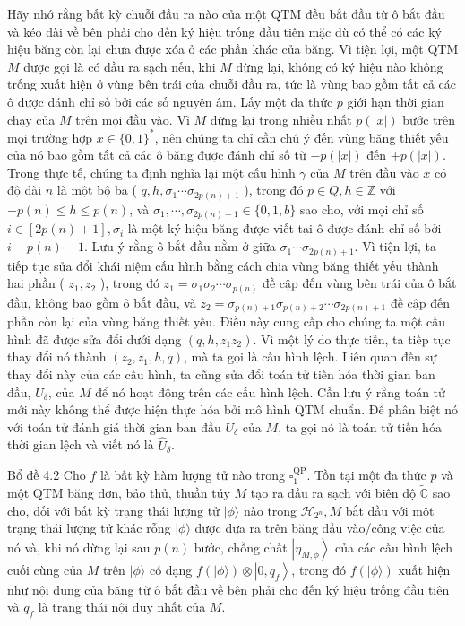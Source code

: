 \documentclass[10pt]{article}
\begin{document}
Hãy nhớ rằng bất kỳ chuỗi đầu ra nào của một QTM đều bắt đầu từ ô bắt đầu và kéo dài về bên phải cho đến ký hiệu trống đầu tiên mặc dù có thể có các ký hiệu băng còn lại chưa được xóa ở các phần khác của băng. Vì tiện lợi, một QTM $M$ được gọi là có đầu ra sạch nếu, khi $M$ dừng lại, không có ký hiệu nào không trống xuất hiện ở vùng bên trái của chuỗi đầu ra, tức là vùng bao gồm tất cả các ô được đánh chỉ số bởi các số nguyên âm. Lấy một đa thức $p$ giới hạn thời gian chạy của $M$ trên mọi đầu vào. Vì $M$ dừng lại trong nhiều nhất $p(|x|)$ bước trên mọi trường hợp $x \in\{0,1\}^{*}$, nên chúng ta chỉ cần chú ý đến vùng băng thiết yếu của nó bao gồm tất cả các ô băng được đánh chỉ số từ $-p(|x|)$ đến $+p(|x|)$. Trong thực tế, chúng ta định nghĩa lại một cấu hình $\gamma$ của $M$ trên đầu vào $x$ có độ dài $n$ là một bộ ba ( $q, h, \sigma_{1} \cdots \sigma_{2 p(n)+1}$ ), trong đó $p \in Q, h \in \mathbb{Z}$ với $-p(n) \leq h \leq p(n)$, và $\sigma_{1}, \cdots, \sigma_{2 p(n)+1} \in\{0,1, b\}$ sao cho, với mọi chỉ số $i \in[2 p(n)+1], \sigma_{i}$ là một ký hiệu băng được viết tại ô được đánh chỉ số bởi $i-p(n)-1$. Lưu ý rằng ô bắt đầu nằm ở giữa $\sigma_{1} \cdots \sigma_{2 p(n)+1}$. Vì tiện lợi, ta tiếp tục sửa đổi khái niệm cấu hình bằng cách chia vùng băng thiết yếu thành hai phần ( $z_{1}, z_{2}$ ), trong đó $z_{1}=\sigma_{1} \sigma_{2} \cdots \sigma_{p(n)}$ đề cập đến vùng bên trái của ô bắt đầu, không bao gồm ô bắt đầu, và $z_{2}=\sigma_{p(n)+1} \sigma_{p(n)+2} \cdots \sigma_{2 p(n)+1}$ đề cập đến phần còn lại của vùng băng thiết yếu. Điều này cung cấp cho chúng ta một cấu hình đã được sửa đổi dưới dạng $\left(q, h, z_{1} z_{2}\right)$. Vì một lý do thực tiễn, ta tiếp tục thay đổi nó thành $\left(z_{2}, z_{1}, h, q\right)$, mà ta gọi là cấu hình lệch. Liên quan đến sự thay đổi này của các cấu hình, ta cũng sửa đổi toán tử tiến hóa thời gian ban đầu, $U_{\delta}$, của $M$ để nó hoạt động trên các cấu hình lệch. Cần lưu ý rằng toán tử mới này không thể được hiện thực hóa bởi mô hình QTM chuẩn. Để phân biệt nó với toán tử đánh giá thời gian ban đầu $U_{\delta}$ của $M$, ta gọi nó là toán tử tiến hóa thời gian lệch và viết nó là $\widehat{U}_{\delta}$.

Bổ đề 4.2 Cho $f$ là bất kỳ hàm lượng tử nào trong $\square_{1}^{\mathrm{QP}}$. Tồn tại một đa thức $p$ và một QTM băng đơn, bảo thủ, thuần túy $M$ tạo ra đầu ra sạch với biên độ $\tilde{\mathbb{C}}$ sao cho, đối với bất kỳ trạng thái lượng tử $|\phi\rangle$ nào trong $\mathcal{H}_{2^{n}}, M$ bắt đầu với một trạng thái lượng tử khác rỗng $|\phi\rangle$ được đưa ra trên băng đầu vào/công việc của nó và, khi nó dừng lại sau $p(n)$ bước, chồng chất $\left|\eta_{M, \phi}\right\rangle$ của các cấu hình lệch cuối cùng của $M$ trên $|\phi\rangle$ có dạng $f(|\phi\rangle) \otimes\left|0, q_{f}\right\rangle$, trong đó $f(|\phi\rangle)$ xuất hiện như nội dung của băng từ ô bắt đầu về bên phải cho đến ký hiệu trống đầu tiên và $q_{f}$ là trạng thái nội duy nhất của $M$.
\end{document}
